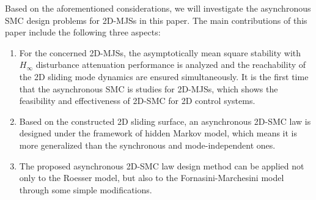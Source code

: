 \documentclass[conference]{IEEEtran}
\begin{document}
	Based on the aforementioned considerations, we will investigate the asynchronous SMC design problems for 2D-MJSs in this paper. 
	The main contributions of this paper include the following three aspects:
	\begin{enumerate}
		\item  For the concerned 2D-MJSs, the asymptotically mean square stability with $H_{\infty}$ disturbance attenuation  performance is analyzed and the reachability of the 2D sliding mode dynamics are ensured simultaneously. It is the first time that the asynchronous SMC is studies for 2D-MJSs, which shows the feasibility and effectiveness of 2D-SMC for 2D control systems.
		\item   Based on the constructed 2D sliding surface, an asynchronous 2D-SMC law is designed under the framework of hidden Markov model, which means it is more generalized than the synchronous and mode-independent ones.
		\item  The proposed asynchronous 2D-SMC law design method can be applied not only to the Roesser model, but also to the  Fornasini-Marchesini  model through some simple modifications.
	\end{enumerate}
\end{document}
